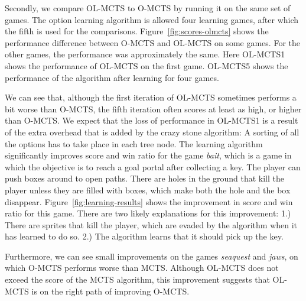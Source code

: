 Secondly, we compare OL-MCTS to O-MCTS by running it on the same set of games.
The option learning algorithm is allowed four learning games, after which the
fifth is used for the comparisons. Figure~\ref{fig:scores-olmcts} shows the
performance difference between O-MCTS and OL-MCTS on some games. For the other
games, the performance was approximately the same. Here OL-MCTS1 shows the
performance of OL-MCTS on the first game. OL-MCTS5 shows the performance of the
algorithm after learning for four games. 

We can see that, although the first iteration of OL-MCTS sometimes performs a
bit worse than O-MCTS, the fifth iteration often scores at least as high, or
higher than O-MCTS\@. We expect that the loss of performance in OL-MCTS1 is
a result of the extra overhead that is added by the crazy stone algorithm: A
sorting of all the options has to take place in each tree node. The learning
algorithm significantly improves score and win ratio for the game \textit{bait},
which is a game in which the objective is to reach a goal portal after
collecting a key.  The player can push boxes around to open paths. There are
holes in the ground that kill the player unless they are filled with boxes,
which make both the hole and the box disappear. 
Figure~\ref{fig:learning-results} shows the improvement in score and win ratio
for this game. There are two likely explanations for this improvement: 1.) There
are sprites that kill the player, which are evaded by the algorithm when it has
learned to do so.  2.) The algorithm learns that it should pick up the key.

Furthermore, we can see small improvements on the games \textit{seaquest} and
\textit{jaws}, on which O-MCTS performs worse than MCTS\@.  Although OL-MCTS
does not exceed the score of the MCTS algorithm, this improvement suggests
that OL-MCTS is on the right path of improving O-MCTS\@.

